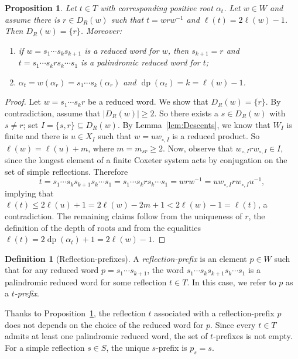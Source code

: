 \documentclass{amsart}
\newtheorem{Proposition}[Theorem]{Proposition}
\theoremstyle{definition}
\newtheorem{Definition}[Theorem]{Definition}
\newcommand{\dep}{\operatorname{dp}}
\begin{document}
 \begin{Proposition}\label{prop:Pref1} Let $t\in T$ with corresponding positive root $\alpha_t$. Let  $w\in W$ and assume there is $r\in D_R(w)$ such that $t=wrw^{-1}$ and $\ell(t)=2\ell(w)-1$. Then $D_R(w)=\{r\}$. Moreover: 
 \begin{enumerate}

\item if $w=s_1\cdots s_k s_{k+1}$ is a reduced word for $w$, then $s_{k+1}=r$ and $t=s_1\cdots s_k r s_k\cdots s_1$ is a palindromic reduced word for $t$;
\item $\alpha_t=w(\alpha_r)= s_1\cdots s_k(\alpha_r)$ and  $\dep(\alpha_t)=k=\ell(w)-1$.
\end{enumerate}
%
\end{Proposition}
\begin{proof}   Let $w=s_1\cdots s_k r$ be a reduced word.  We show that $D_R(w)=\{r\}$. By contradiction, assume that $|D_R(w)|\geq 2$. So there exists  a $s\in D_R(w)$ with $s\not = r$; set $I=\{s,r\}\subseteq D_R(w)$.  By Lemma~\ref{lem:Descents},  we know that $W_I$ is finite and  there is $u\in X_I$ such that $w=u w_{\circ,I}$ is a reduced product. So $\ell(w)=\ell(u)+m$, where $m=m_{sr}\geq 2$. Now, observe that  $w_{\circ,I}rw_{\circ,I}\in I$, since the longest element of a finite Coxeter system acts by conjugation on the set of simple reflections. Therefore 
$$
t= s_1\cdots s_k s_{k+1} s_k\cdots s_1 =s_1\cdots s_k r s_k\cdots s_1=w r w^{-1}=uw_{\circ,I}rw_{\circ,I}u^{-1},
$$
implying that $\ell(t)\leq 2\ell(u)+1=2\ell(w)-2m+1<2\ell(w)-1=\ell(t)$, a contradiction. The remaining claims follow from the uniqueness of $r$, the definition of the depth of roots and from the equalities $\ell(t)=2\dep(\alpha_t)+1=2\ell(w)-1$.
\end{proof}
 

\begin{Definition}[Reflection-prefixes] A {\em reflection-prefix} is an element $p\in W$ such that for any reduced word $p= s_1 \cdots s_{k+1}$, the word $s_1 \cdots s_k s_{k+1} s_k\cdots s_1$ is a palindromic reduced word for some  reflection $t\in T$. In this case, we refer to $p$ as a {\em $t$-prefix}. 
\end{Definition}

Thanks to Proposition~\ref{prop:Pref1}, the reflection $t$ associated with a reflection-prefix $p$ does not depends on the choice of the reduced word for $p$. Since every $t\in T$ admits at least one palindromic reduced word, the set of $t$-prefixes is not empty. For a simple reflection $s\in S$, the unique $s$-prefix is $p_s=s$. 
\end{document}
